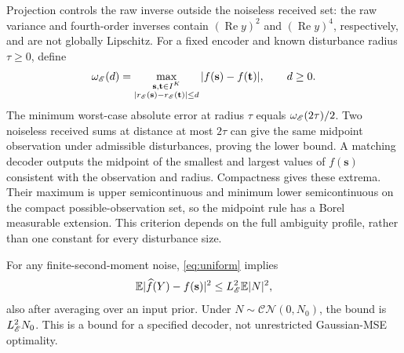 Projection controls the raw inverse outside the noiseless received set: the raw variance and fourth-order inverses contain $(\operatorname{Re}y)^2$ and $(\operatorname{Re}y)^4$, respectively, and are not globally Lipschitz. For a fixed encoder and known disturbance radius $\tau\ge0$, define
$$\omega_\mathscr E(d)=\max_{\substack{\mathbf s,\mathbf t\in I^K\\|r_\mathscr E(\mathbf s)-r_\mathscr E(\mathbf t)|\le d}}|f(\mathbf s)-f(\mathbf t)|,\qquad d\ge0.$$
The minimum worst-case absolute error at radius $\tau$ equals $\omega_\mathscr E(2\tau)/2$. Two noiseless received sums at distance at most $2\tau$ can give the same midpoint observation under admissible disturbances, proving the lower bound. A matching decoder outputs the midpoint of the smallest and largest values of $f(\mathbf s)$ consistent with the observation and radius. Compactness gives these extrema. Their maximum is upper semicontinuous and minimum lower semicontinuous on the compact possible-observation set, so the midpoint rule has a Borel measurable extension. This criterion depends on the full ambiguity profile, rather than one constant for every disturbance size.

For any finite-second-moment noise, \eqref{eq:uniform} implies
$$\mathbb E|\widehat f(Y)-f(\mathbf s)|^2\le L_\mathscr E^2\mathbb E|N|^2,$$
also after averaging over an input prior. Under $N\sim\mathcal{CN}(0,N_0)$, the bound is $L_\mathscr E^2N_0$. This is a bound for a specified decoder, not unrestricted Gaussian-MSE optimality.
